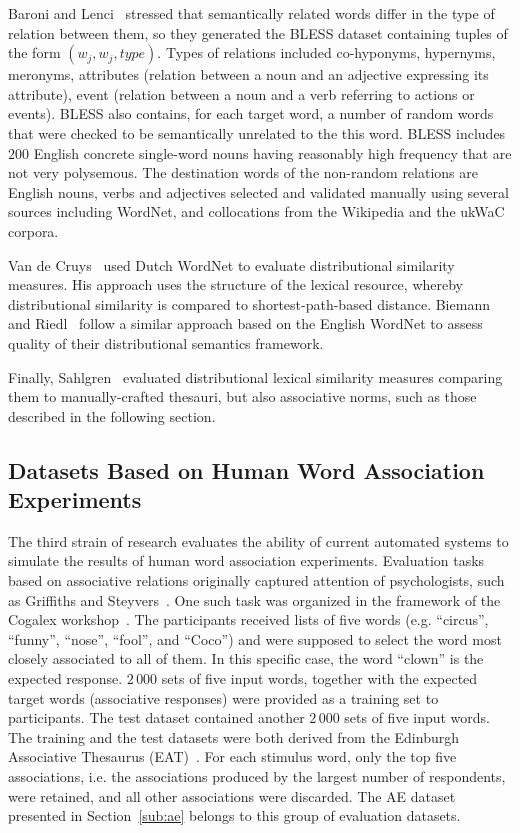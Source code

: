 \documentclass[runningheads,a4paper]{llncs}
\begin{document}
Baroni and Lenci~\cite{Baroni:11} stressed that semantically related words differ in the type of relation between them, so they generated the BLESS dataset containing tuples of the form $(w_j, w_j, \textit{type})$. Types of relations included co-hyponyms, hypernyms, meronyms, attributes (relation between a noun and an adjective expressing its attribute), event (relation between a noun and a verb referring to actions or events). BLESS also contains, for each target word, a number of random words that were checked to be semantically unrelated to the this word. BLESS includes $200$ English concrete single-word nouns having reasonably high frequency that are not very polysemous. The destination words of the non-random relations are English nouns, verbs and adjectives selected and validated manually using several sources including WordNet, and collocations from the Wikipedia and the ukWaC corpora. 

Van de Cruys~\cite{vanDeCruys:10} used Dutch WordNet to evaluate distributional similarity measures. His approach uses the structure of the lexical resource, whereby distributional similarity is compared to shortest-path-based distance. Biemann and Riedl~\cite{Biemann:13} follow a similar approach based on the English WordNet to assess quality of their distributional semantics framework. 

Finally, Sahlgren~\cite{Sahlgren:06} evaluated distributional lexical similarity measures comparing them to manually-crafted thesauri, but also associative norms, such as those described in the following section. 

\subsection{Datasets Based on Human Word Association Experiments}

The third strain of research evaluates the ability of current automated systems to simulate the results of human word association experiments. Evaluation tasks based on associative relations originally captured attention of psychologists, such as Griffiths and Steyvers~\cite{Griffiths:03}. One such task was organized in the framework of the Cogalex workshop~\cite{Rapp:14}. The participants received lists of five  words (e.g.  ``circus'', ``funny'', ``nose'', ``fool'', and ``Coco'') and were supposed to select the word most closely associated to all of them. In this specific case, the word ``clown'' is the expected response. $2\,000$ sets of five input words, together with the expected target words (associative responses) were provided as a training set to participants. The test dataset contained another $2\,000$ sets of five input words. The training and the test datasets were both derived from the Edinburgh Associative Thesaurus (EAT)~\cite{Kiss:73}. For each stimulus word, only the top five associations, i.e. the associations produced by the largest number of respondents, were retained, and all other associations were discarded. The AE dataset presented in Section~\ref{sub:ae} belongs to this group of evaluation datasets.
\end{document}
